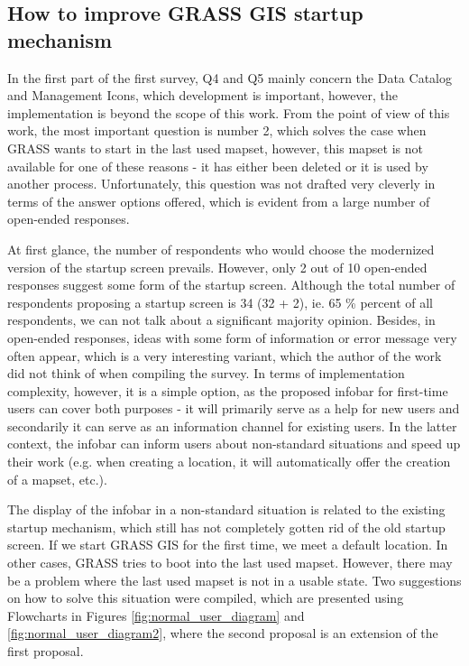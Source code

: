 \documentclass[a4paper,10pt,twoside]{article}
\begin{document}
\subsection{How to improve GRASS GIS startup mechanism}
\label{sec:proposal2}

In the first part of the first survey, Q4 and Q5 mainly concern the
Data Catalog and Management Icons, which development is important,
however, the implementation is beyond the scope of this work. From the
point of view of this work, the most important question is number 2,
which solves the case when GRASS wants to start in the last used
mapset, however, this mapset is not available for one of these reasons
- it has either been deleted or it is used by another
process. Unfortunately, this question was not drafted very cleverly in
terms of the answer options offered, which is evident from a large
number of open-ended responses.

At first glance, the number of respondents who would choose the
modernized version of the startup screen prevails. However, only 2 out
of 10 open-ended responses suggest some form of the startup
screen. Although the total number of respondents proposing a startup
screen is 34 (32 + 2), ie. 65 \% percent of all respondents, we can
not talk about a significant majority opinion. Besides, in open-ended
responses, ideas with some form of information or error message very
often appear, which is a very interesting variant, which the author of
the work did not think of when compiling the survey. In terms of
implementation complexity, however, it is a simple option, as the
proposed infobar for first-time users can cover both purposes - it
will primarily serve as a help for new users and secondarily it can
serve as an information channel for existing users. In the latter
context, the infobar can inform users about non-standard situations
and speed up their work (e.g. when creating a location, it will
automatically offer the creation of a mapset, etc.).

The display of the infobar in a non-standard situation is related to
the existing startup mechanism, which still has not completely gotten
rid of the old startup screen. If we start GRASS GIS for the first
time, we meet a default location. In other cases, GRASS tries to boot
into the last used mapset. However, there may be a problem where the
last used mapset is not in a usable state. Two suggestions on how to
solve this situation were compiled, which are presented using
Flowcharts in Figures \ref{fig:normal_user_diagram} and
\ref{fig:normal_user_diagram2}, where the second proposal is an
extension of the first proposal.
\end{document}
